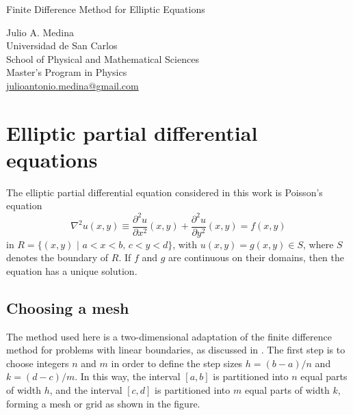 \documentclass[a4paper]{article}
\begin{document}

\Large
 \begin{center}
Finite Difference Method for Elliptic Equations\\


\hspace{10pt}

\large
Julio A. Medina\\
\hspace{10pt}
\small  
Universidad de San Carlos\\
School of Physical and Mathematical Sciences\\
Master's Program in Physics\\
\href{mailto:julioantonio.medina@gmail.com}{julioantonio.medina@gmail.com}\\

\end{center}

\hspace{10pt}

\normalsize
\section{Elliptic partial differential equations}
The elliptic partial differential equation considered in this work is Poisson's equation
\begin{equation}\label{eq::Poisson}
\nabla^2 u(x,y)\equiv \frac{\partial^2 u}{\partial x^2}(x,y) + \frac{\partial^2 u}{\partial y^2}(x,y)=f(x,y)
\end{equation}
in $R=\{ (x,y)\,\,|\,\, a<x<b ,\, c<y<d \}$, with $u(x,y)=g(x,y) \in S$, where $S$ denotes the boundary of $R$. If $f$ and $g$ are continuous on their domains, then the equation has a unique solution.

\subsection{Choosing a mesh}
The method used here is a two-dimensional adaptation of the finite difference method for problems with linear boundaries, as discussed in \cite{Burden}. The first step is to choose integers $n$ and $m$ in order to define the step sizes $h=(b-a)/n$ and $k=(d-c)/m$. In this way, the interval $[a,b]$ is partitioned into $n$ equal parts of width $h$, and the interval $[c,d]$ is partitioned into $m$ equal parts of width $k$, forming a mesh or grid as shown in the figure.
\end{document}
